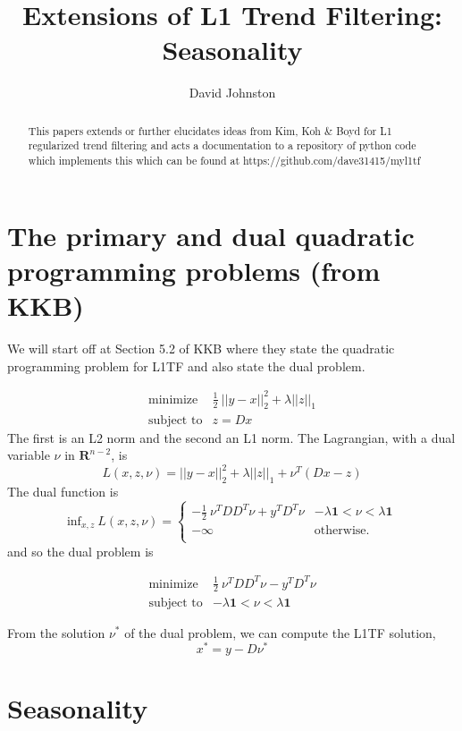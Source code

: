 \documentclass{article}
\begin{document}
\title{Extensions of L1 Trend Filtering: Seasonality}
\author{David Johnston}

\maketitle

\begin{abstract}
This papers extends or further elucidates ideas from Kim, Koh \& Boyd for L1 regularized
trend filtering and acts a documentation to a repository of python code which implements
this which can be found at
https://github.com/dave31415/myl1tf
\end{abstract}

\section{The primary and dual quadratic programming problems (from KKB)}

We will start off at Section 5.2 of KKB where they state the quadratic programming problem for L1TF
and also state the dual problem.

\begin{eqnarray}
\mbox{minimize} & \frac{1}{2} ~ || y - x ||_2^2  + \lambda ||z||_1 \\
\mbox{subject to} & z = D x
\end{eqnarray}
The first is an L2 norm and the second an L1 norm. The Lagrangian, with a dual variable $\nu$ in $\mathbf{R}^{n-2}$, is
\[
L(x,z,\nu) =  || y - x ||_2^2  + \lambda ||z||_1 + \nu^T (D x -z)
\]
The dual function is
\[
\mbox{inf}_{x,z} ~ L(x,z,\nu) =
    \left\{
    \begin{array}{ll}
    - \frac{1}{2} ~ \nu^T D D^T \nu + y^T D^T \nu &  - \lambda \mathbf{1} < \nu < \lambda \mathbf{1} \\
  -\infty  & \mbox{otherwise.} \\
  \end{array}
  \right.
\]
and so the dual problem is

\begin{eqnarray}
\mbox{minimize} & \frac{1}{2} ~ \nu^T D D^T \nu - y^T D^T \nu \\
\mbox{subject to} & - \lambda \mathbf{1} < \nu < \lambda \mathbf{1}
\end{eqnarray}

From the solution $\nu^*$ of the dual problem, we can compute the L1TF solution,
\[
x^* = y - D \nu^*
\]

\section{Seasonality}
\end{document}
